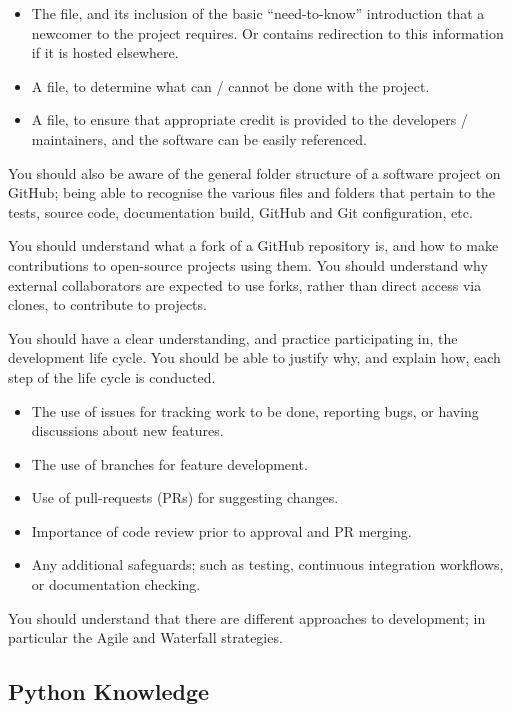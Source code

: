 \begin{itemize}
  \item The  file, and its inclusion of the basic ``need-to-know'' introduction that a newcomer to the project requires.
        Or contains redirection to this information if it is hosted elsewhere.
  \item A  file, to determine what can / cannot be done with the project.
  \item A  file, to ensure that appropriate credit is provided to the developers / maintainers, and the software can be easily referenced.
\end{itemize}

You should also be aware of the general folder structure of a software project on GitHub; being able to recognise the various files and folders that pertain to the tests, source code, documentation build, GitHub and Git configuration, etc.

You should understand what a fork of a GitHub repository is, and how to make contributions to open-source projects using them.
You should understand why external collaborators are expected to use forks, rather than direct access via clones, to contribute to projects.

You should have a clear understanding, and practice participating in, the development life cycle.
You should be able to justify why, and explain how, each step of the life cycle is conducted.

\begin{itemize}
  \item The use of issues for tracking work to be done, reporting bugs, or having discussions about new features.
  \item The use of branches for feature development.
  \item Use of pull-requests (PRs) for suggesting changes.
  \item Importance of code review prior to approval and PR merging.
  \item Any additional safeguards; such as testing, continuous integration workflows, or documentation checking.
\end{itemize}

You should understand that there are different approaches to development; in particular the Agile and Waterfall strategies.

\subsection{Python Knowledge}

